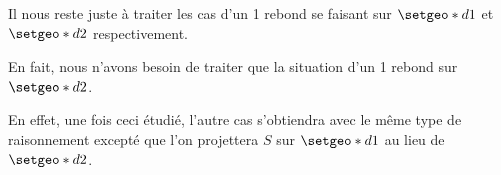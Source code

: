 Il nous reste juste à traiter les cas d'un 1\ier{} rebond se faisant sur $\setgeo*{d}{1}$ et $\setgeo*{d}{2}$ respectivement.

\begin{tcolorbox}
	\centering\itshape
	
	En fait, nous n'avons besoin de traiter que la situation d'un 1\ier{} rebond sur $\setgeo*{d}{2}$.
\end{tcolorbox}

En effet, une fois ceci étudié, l'autre cas s'obtiendra avec le même type de raisonnement excepté que l'on projettera $S$ sur $\setgeo*{d}{1}$ au lieu de $\setgeo*{d}{2}$.

